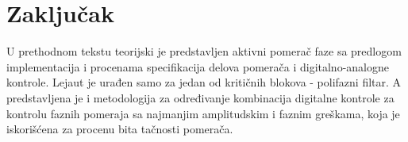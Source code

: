 \documentclass[journal,twocolumn,letterpaper]{IEEEJERM}
\begin{document}

\section{Zaključak}

U prethodnom tekstu teorijski je predstavljen aktivni pomerač faze sa predlogom implementacija i procenama specifikacija delova pomerača i digitalno-analogne kontrole. Lejaut je urađen samo za jedan od kritičnih blokova - polifazni filtar. A predstavljena je i metodologija za određivanje kombinacija digitalne kontrole za kontrolu faznih pomeraja sa najmanjim amplitudskim i faznim greškama, koja je iskorišćena za procenu bita tačnosti pomerača.



\end{document}
